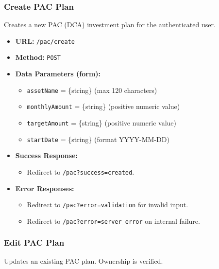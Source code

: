\subsubsection{Create PAC Plan}

Creates a new PAC (DCA) investment plan for the authenticated user.

\begin{itemize}
    \item \textbf{URL:} \texttt{/pac/create}
    \item \textbf{Method:} \texttt{POST}
    \item \textbf{Data Parameters (form):}
    \begin{itemize}
        \item \texttt{assetName} = \{string\} (max 120 characters)
        \item \texttt{monthlyAmount} = \{string\} (positive numeric value)
        \item \texttt{targetAmount} = \{string\} (positive numeric value)
        \item \texttt{startDate} = \{string\} (format YYYY-MM-DD)
    \end{itemize}
    \item \textbf{Success Response:}
    \begin{itemize}
        \item Redirect to \texttt{/pac?success=created}.
    \end{itemize}
    \item \textbf{Error Responses:}
    \begin{itemize}
        \item Redirect to \texttt{/pac?error=validation} for invalid input.
        \item Redirect to \texttt{/pac?error=server\_error} on internal failure.
    \end{itemize}
\end{itemize}

\subsubsection{Edit PAC Plan}

Updates an existing PAC plan. Ownership is verified.

